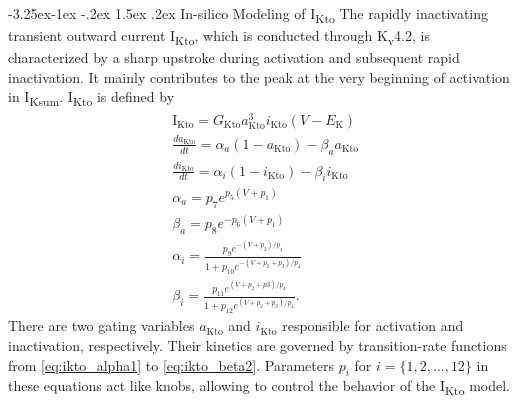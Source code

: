 \documentclass[11pt]{article}
\makeatletter
\renewcommand\subsubsection{\@startsection{subsubsection}{3}{\z@}%
                                    {-3.25ex\@plus -1ex \@minus -.2ex}%
                                     {1.5ex \@plus .2ex}%
                                     {\normalfont\normalsize\fontfamily{phv}\fontsize{14}{17}\selectfont}}
\makeatother
\begin{document}
\subsubsection{In-silico Modeling of I\textsubscript{Kto}}
The rapidly inactivating transient outward current I\textsubscript{Kto}, which is conducted through K\textsubscript{v}4.2, is characterized by a sharp upstroke during activation and subsequent rapid inactivation. It mainly contributes to the peak at the very beginning of activation in I\textsubscript{Ksum}. I\textsubscript{Kto} is defined by
\begin{align}
    &\mathrm{I}_{\mathrm{Kto}} = G_{\mathrm{Kto}}a_{\mathrm{Kto}}^{3}i_{\mathrm{Kto}}(V-E_{\mathrm{K}}) \\
    &\frac{da_{\mathrm{Kto}}}{dt} = \alpha_{a}(1-a_{\mathrm{Kto}}) - \beta_{a}a_{\mathrm{Kto}} \\
    &\frac{di_{\mathrm{Kto}}}{dt} = \alpha_{i}(1-i_{\mathrm{Kto}}) - \beta_{i}i_{\mathrm{Kto}} \\
    &\alpha_{a} = p_{7}e^{p_{5}(V+p_{1})} \label{eq:ikto_alpha1} \\
    &\beta_{a}= p_{8}e^{-p_6(V+p_{1})} \\
    &\alpha_{i} = \frac{p_{9}e^{-(V+p_{2})/p_{4}}}{1+p_{10}e^{-(V+p_{2}+p_{3})/p_{4}}} \\
    & \beta_{i} = \frac{p_{11}e^{(V+p_{2}+p{3})/p_{4}}}{1+p_{12}e^{(V+p_{2}+p_{3})/p_{4}}}.
    \label{eq:ikto_beta2}
\end{align}
There are two gating variables $a_{\mathrm{Kto}}$ and $i_{\mathrm{Kto}}$ responsible for activation and inactivation, respectively. Their kinetics are governed by transition-rate functions from \eqref{eq:ikto_alpha1} to \eqref{eq:ikto_beta2}. Parameters $p_{i}$ for $i=\{1, 2, \dots, 12\}$ in these equations act like knobs, allowing to control the behavior of the I\textsubscript{Kto} model.
\end{document}
